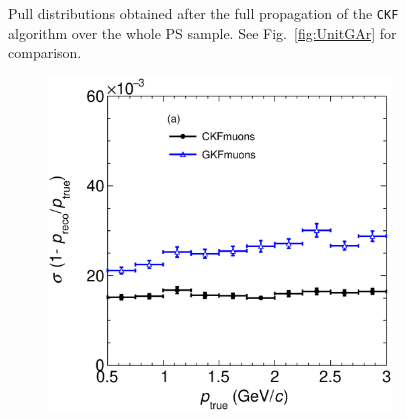 \begin{figure}[t]
\begin{subfigure}{0.42\textwidth}
         \caption{}
         \label{fig:pResGKF13_PGun}
     \end{subfigure}
        \caption{Pull distributions obtained after the full propagation of the \texttt{CKF} algorithm over the whole PS sample. See Fig.~\ref{fig:UnitGAr} for comparison.}
        \label{fig:pRes1D_PGun}
\end{figure}

\begin{figure}[t]
     \centering
     \begin{subfigure}{0.38\textwidth}
         \centering
         \includegraphics[width=\textwidth]{figures/ch5-KF_NDGAr/FullSample/PGun/pRes/RespVSp_pgun.eps}
         \caption{}
         \label{fig:pResVSp_PGun}
     \end{subfigure}
     \begin{subfigure}{0.38\textwidth}
         \centering

\end{subfigure}
\end{figure}
